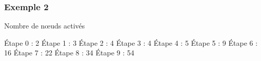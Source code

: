 \documentclass[12pt]{beamer}
\begin{document}
\begin{frame}
  \frametitle{Exemple 2}
  
  \begin{block}{Nombre de n\oe uds activés}
   \begin{overprint}
 Étape 0 : 2
 Étape 1 : 3
 Étape 2 : 4
 Étape 3 : 4
 Étape 4 : 5
 Étape 5 : 9
 Étape 6 : 16
 Étape 7 : 22
 Étape 8 : 34
 Étape 9 : 54
\end{overprint}
  \end{block}

  
  \begin{overlayarea}{8cm}{8cm}

\end{overlayarea}
\end{frame}
\end{document}
